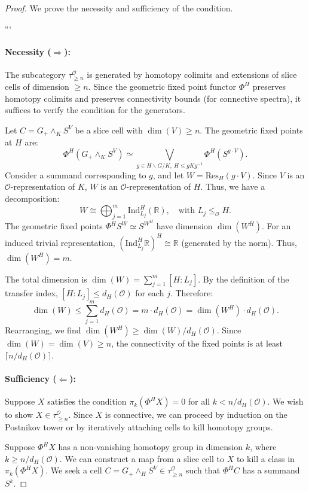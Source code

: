 \documentclass[11pt]{article}
\theoremstyle{plain}
\theoremstyle{definition}
\newcommand{\Ocal}{\mathcal{O}}
\newcommand{\Ind}{\mathrm{Ind}}
\newcommand{\Res}{\mathrm{Res}}
\newcommand{\R}{\mathbb{R}}
\newcommand{\slice}[1]{\tau_{\ge #1}^{\Ocal}}
\begin{document}
\begin{proof}
We prove the necessity and sufficiency of the condition.

```
\paragraph{Necessity ($\Rightarrow$):}
The subcategory $\slice{n}$ is generated by homotopy colimits and extensions of slice cells of dimension $\ge n$. Since the geometric fixed point functor $\Phi^H$ preserves homotopy colimits and preserves connectivity bounds (for connective spectra), it suffices to verify the condition for the generators.

Let $C = G_+ \wedge_K S^V$ be a slice cell with $\dim(V) \ge n$. The geometric fixed points at $H$ are:
\[
    \Phi^H(G_+ \wedge_K S^V) \simeq \bigvee_{g \in H \backslash G / K, \ H \le gKg^{-1}} \Phi^H(S^{g \cdot V}).
\]
Consider a summand corresponding to $g$, and let $W = \Res_H (g \cdot V)$. Since $V$ is an $\Ocal$-representation of $K$, $W$ is an $\Ocal$-representation of $H$. Thus, we have a decomposition:
\[
    W \cong \bigoplus_{j=1}^m \Ind_{L_j}^H (\R), \quad \text{with } L_j \le_\Ocal H.
\]
The geometric fixed points $\Phi^H S^W \simeq S^{W^H}$ have dimension $\dim(W^H)$. For an induced trivial representation, $(\Ind_{L_j}^H \R)^H \cong \R$ (generated by the norm). Thus, $\dim(W^H) = m$.

The total dimension is $\dim(W) = \sum_{j=1}^m [H:L_j]$. By the definition of the transfer index, $[H:L_j] \le d_H(\Ocal)$ for each $j$. Therefore:
\[
    \dim(W) \le \sum_{j=1}^m d_H(\Ocal) = m \cdot d_H(\Ocal) = \dim(W^H) \cdot d_H(\Ocal).
\]
Rearranging, we find $\dim(W^H) \ge \dim(W) / d_H(\Ocal)$. Since $\dim(W) = \dim(V) \ge n$, the connectivity of the fixed points is at least $\lceil n / d_H(\Ocal) \rceil$.

\paragraph{Sufficiency ($\Leftarrow$):}
Suppose $X$ satisfies the condition $\pi_k(\Phi^H X) = 0$ for all $k < n / d_H(\Ocal)$. We wish to show $X \in \slice{n}$. Since $X$ is connective, we can proceed by induction on the Postnikov tower or by iteratively attaching cells to kill homotopy groups.

Suppose $\Phi^H X$ has a non-vanishing homotopy group in dimension $k$, where $k \ge n / d_H(\Ocal)$. We can construct a map from a slice cell to $X$ to kill a class in $\pi_k(\Phi^H X)$. We seek a cell $C = G_+ \wedge_H S^V \in \slice{n}$ such that $\Phi^H C$ has a summand $S^k$.


\end{proof}
\end{document}
